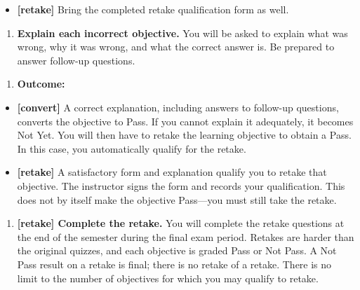 \documentclass[11pt]{article}
\begin{document}
\begin{samepage}
\begin{itemize}
\item \textbf{[retake]} Bring the completed retake qualification form as well.
\end{itemize}
\end{samepage}

\begin{samepage}
\begin{enumerate}
\item[4.] \textbf{Explain each incorrect objective.} You will be asked to explain what was wrong, why it was wrong, and what the correct answer is. Be prepared to answer follow-up questions.
\end{enumerate}
\end{samepage}

\begin{samepage}
\begin{enumerate}
\item[5.] \textbf{Outcome:}
\end{enumerate}
\end{samepage}

\begin{samepage}
\begin{itemize}
\item \textbf{[convert]} A correct explanation, including answers to follow-up questions, converts the objective to Pass. If you cannot explain it adequately, it becomes Not Yet. You will then have to retake the learning objective to obtain a Pass. In this case, you automatically qualify for the retake.
\end{itemize}
\end{samepage}

\begin{samepage}
\begin{itemize}
\item \textbf{[retake]} A satisfactory form and explanation qualify you to retake that objective. The instructor signs the form and records your qualification. This does not by itself make the objective Pass—you must still take the retake.
\end{itemize}
\end{samepage}

\begin{samepage}
\begin{enumerate}
\item[6.] \textbf{[retake] Complete the retake.} You will complete the retake questions at the end of the semester during the final exam period. Retakes are harder than the original quizzes, and each objective is graded Pass or Not Pass. A Not Pass result on a retake is final; there is no retake of a retake. There is no limit to the number of objectives for which you may qualify to retake.
\end{enumerate}
\end{samepage}
\end{document}
